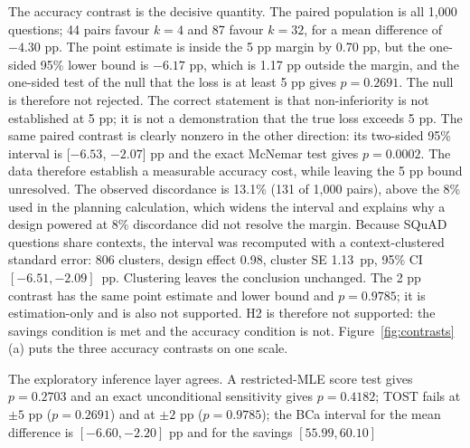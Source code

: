 \documentclass[a4paper,fleqn]{cas-sc}
\begin{document}
The accuracy contrast is the decisive quantity. The paired population is all 1{,}000 questions; 44 pairs favour $k=4$ and 87 favour $k=32$, for a mean difference of $-4.30$ pp. The point estimate is inside the 5 pp margin by 0.70 pp, but the one-sided 95\% lower bound is $-6.17$ pp, which is 1.17 pp outside the margin, and the one-sided test of the null that the loss is at least 5 pp gives $p=0.2691$. The null is therefore not rejected. The correct statement is that non-inferiority is not established at 5 pp; it is not a demonstration that the true loss exceeds 5 pp. The same paired contrast is clearly nonzero in the other direction: its two-sided 95\% interval is [$-6.53$, $-2.07$] pp and the exact McNemar test gives $p=0.0002$. The data therefore establish a measurable accuracy cost, while leaving the 5 pp bound unresolved. The observed discordance is 13.1\% (131 of 1{,}000 pairs), above the 8\% used in the planning calculation, which widens the interval and explains why a design powered at 8\% discordance did not resolve the margin. Because SQuAD questions share contexts, the interval was recomputed with a context-clustered standard error: 806 clusters, design effect 0.98, cluster SE 1.13~pp, 95\% CI $[-6.51,-2.09]$~pp. Clustering leaves the conclusion unchanged. The 2 pp contrast has the same point estimate and lower bound and $p=0.9785$; it is estimation-only and is also not supported. H2 is therefore not supported: the savings condition is met and the accuracy condition is not. Figure~\ref{fig:contrasts}(a) puts the three accuracy contrasts on one scale.

The exploratory inference layer agrees. A restricted-MLE score test gives $p=0.2703$ and an exact unconditional sensitivity gives $p=0.4182$; TOST fails at $\pm5$ pp ($p=0.2691$) and at $\pm2$ pp ($p=0.9785$); the BCa interval for the mean difference is $[-6.60,-2.20]$ pp and for the savings $[55.99,60.10]$%
\end{document}
